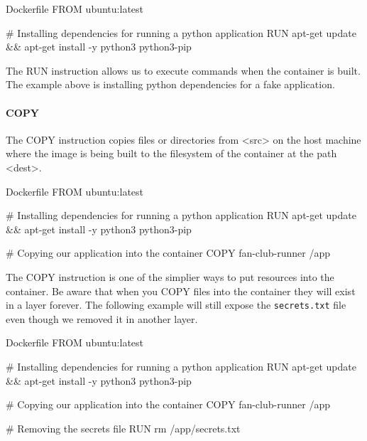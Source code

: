 \documentclass{csse4400}
\begin{document}
\begin{code}[language=docker,numbers=none]{Dockerfile}
FROM ubuntu:latest

# Installing dependencies for running a python application
RUN apt-get update && apt-get install -y python3 python3-pip
\end{code}

The RUN instruction allows us to execute commands when the container is built.
The example above is installing python dependencies for a fake application.

\paragraph{COPY}
The COPY instruction copies files or directories from <src> on the host machine where the image is being built to the filesystem of the container at the path <dest>.

\begin{code}[language=docker,numbers=none]{Dockerfile}
FROM ubuntu:latest

# Installing dependencies for running a python application
RUN apt-get update && apt-get install -y python3 python3-pip

# Copying our application into the container
COPY fan-club-runner /app
\end{code}

The COPY instruction is one of the simplier ways to put resources into the container.
Be aware that when you COPY files into the container they will exist in a layer forever.
The following example will still expose the \texttt{secrets.txt} file even though we removed it in another layer.

\begin{code}[language=docker,numbers=none]{Dockerfile}
FROM ubuntu:latest

# Installing dependencies for running a python application
RUN apt-get update && apt-get install -y python3 python3-pip

# Copying our application into the container
COPY fan-club-runner /app

# Removing the secrets file
RUN rm /app/secrets.txt
\end{code}
\end{document}
